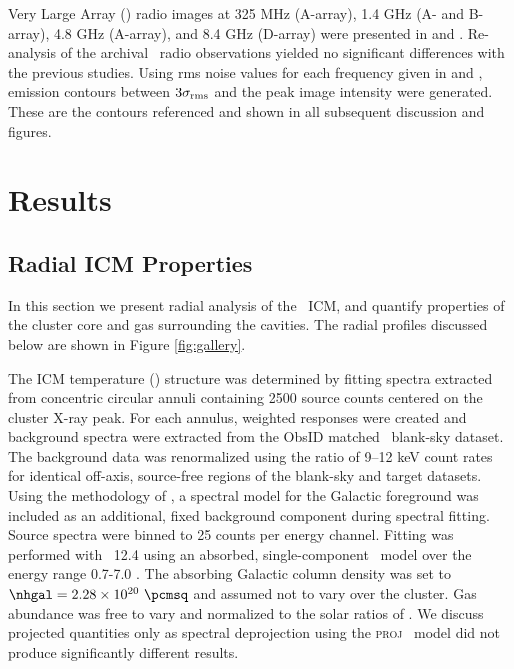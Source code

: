\documentclass{emulateapj}
\begin{document}
Very Large Array (\vla) radio images at 325 MHz (A-array), 1.4 GHz (A-
and B-array), 4.8 GHz (A-array), and 8.4 GHz (D-array) were presented
in \citet{gitti06} and \citet{birzan08}. Re-analysis of the archival
\vla\ radio observations yielded no significant differences with the
previous studies. Using rms noise values for each frequency given in
\citet{gitti06} and \citet{birzan08}, emission contours between
$3\sigma_{\rm{rms}}$ and the peak image intensity were
generated. These are the contours referenced and shown in all
subsequent discussion and figures.

\section{Results}
\label{sec:results}

\subsection{Radial ICM Properties}
\label{sec:icm}

In this section we present radial analysis of the \rxj\ ICM, and
quantify properties of the cluster core and gas surrounding the
cavities. The radial profiles discussed below are shown in Figure
\ref{fig:gallery}.

The ICM temperature (\tx) structure was determined by fitting spectra
extracted from concentric circular annuli containing 2500 source
counts centered on the cluster X-ray peak. For each annulus, weighted
responses were created and background spectra were extracted from the
ObsID matched \caldb\ blank-sky dataset. The background data was
renormalized using the ratio of 9--12 keV count rates for identical
off-axis, source-free regions of the blank-sky and target
datasets. Using the methodology of \citet{2005ApJ...628..655V}, a
spectral model for the Galactic foreground was included as an
additional, fixed background component during spectral fitting. Source
spectra were binned to 25 counts per energy channel. Fitting was
performed with \xspec\ 12.4 \citep{xspec} using an absorbed,
single-component \mekal\ model \citep{mekal1} over the energy range
0.7-7.0 \keV. The absorbing Galactic column density was set to $\nhgal
= 2.28 \times 10^{20} ~\pcmsq$ \citep{lab} and assumed not to vary
over the cluster. Gas abundance was free to vary and normalized to the
solar ratios of \citet{ag89}. We discuss projected quantities only as
spectral deprojection using the {\textsc{proj}} \xspec\ model did not
produce significantly different results.
\end{document}
